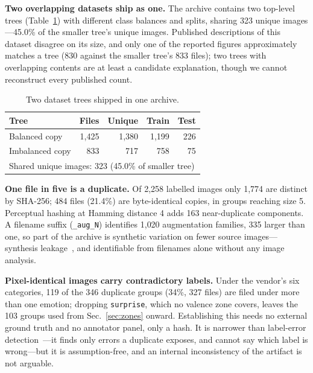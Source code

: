 \documentclass[conference,10pt]{IEEEtran}
\begin{document}
\textbf{Two overlapping datasets ship as one.} The archive contains two
top-level trees (Table~\ref{tab:trees}) with different class balances and
splits, sharing 323 unique images---45.0\% of the smaller tree's unique images. Published descriptions of this
dataset disagree on its size, and only one of the reported figures approximately
matches a tree (830 against the smaller tree's 833 files); two trees with overlapping contents are at least a candidate
explanation, though we cannot reconstruct every published count.

\begin{table}[t]
\caption{Two dataset trees shipped in one archive.}
\label{tab:trees}
\centering
\setlength{\tabcolsep}{4pt}
\begin{tabular}{lrrrr}
\toprule
Tree & Files & Unique & Train & Test\\
\midrule
Balanced copy & 1{,}425 & 1{,}380 & 1{,}199 & 226\\
Imbalanced copy & 833 & 717 & 758 & 75\\
\midrule
\multicolumn{5}{l}{Shared unique images: 323 (45.0\% of smaller tree)}\\
\bottomrule
\end{tabular}
\end{table}

\textbf{One file in five is a duplicate.} Of 2{,}258 labelled images only
1{,}774 are distinct by SHA-256; 484 files (21.4\%) are byte-identical copies,
in groups reaching size 5. Perceptual hashing at Hamming distance 4 adds 163
near-duplicate components. A filename suffix (\texttt{\_aug\_N}) identifies
1{,}020 augmentation families, 335 larger than one, so part of the archive is
synthetic variation on fewer source images---synthesis
leakage~\cite{apicella2025}, and identifiable from filenames alone without any
image analysis.

\textbf{Pixel-identical images carry contradictory labels.} Under the vendor's
six categories, 119 of the 346 duplicate groups (34\%, 327 files) are filed
under more than one emotion; dropping \texttt{surprise}, which no valence zone
covers, leaves the 103 groups used from Sec.~\ref{sec:zones} onward. Establishing this needs no
external ground truth and no annotator panel, only a hash. It is narrower than
label-error detection~\cite{northcutt2021}---it finds only errors a duplicate
exposes, and cannot say which label is wrong---but it is assumption-free, and an
internal inconsistency of the artifact is not arguable.
\end{document}
